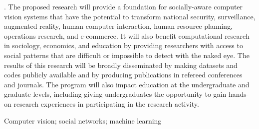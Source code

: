 . The proposed research will provide a foundation for socially-aware computer vision systems that have the potential to transform national security, surveillance, augmented reality, human computer interaction, human resource planning, operations research, and e-commerce. It will also benefit computational research in sociology, economics, and education by providing researchers with access to social patterns that are difficult or impossible to detect with the naked eye. The results of this research will be broadly disseminated by making datasets and codes publicly available and by producing publications in refereed conferences and journals. The program will also impact education at the undergraduate and graduate levels, including giving undergraduates the opportunity to gain hands-on research experiences in participating in the research activity. 

 Computer vision; social networks; machine learning


